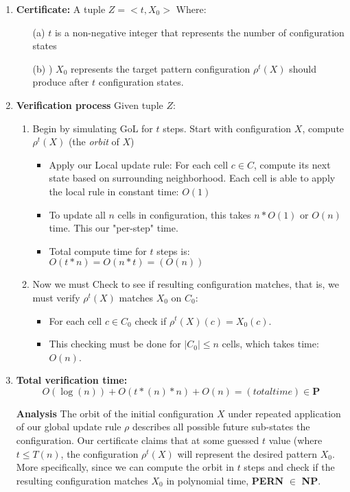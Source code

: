 \documentclass{article}
\theoremstyle{definition}
\theoremstyle{plain}
\theoremstyle{plain}
\begin{document}
\begin{enumerate}
    \item \textbf{Certificate:} A tuple $Z = <t, X_0 >$
      Where: 
      \begin{enumerate}
          \item[(a)] $t$ is a non-negative integer that represents the number of configuration states 
          \item[(b)]) $X_0$ represents the target pattern configuration $\rho^t(X)$ should produce after $t$ configuration states.
      \end{enumerate}
    \item \textbf{Verification process} Given tuple $Z$:
    \begin{enumerate}
        \item Begin by simulating GoL for $t$ steps. Start with configuration $X$, compute $\rho^t(X)$ (the \textit{orbit} of $X$)
        \begin{itemize}
            \item Apply our Local update rule: For each cell $c \in C$, compute its next state based on surrounding neighborhood. Each cell is able to apply the local rule in constant time: $O(1)$
            \item To update all $n$ cells in configuration, this takes $n*O(1)$ or $O(n)$ time. This our "per-step" time.
            \item Total compute time for $t$ steps is: $O(t * n) = O(n * t) = (O(n))$
        \end{itemize}
        \item Now we must Check to see if resulting configuration matches, that is, we must verify $\rho^t(X)$  matches $X_0$ on $C_0$:
        \begin{itemize}
            \item For each cell $c \in C_0$ check if $\rho^t(X)(c) = X_0(c)$.
            \item This checking must be done for $ |C_0| \leq n $ cells, which takes time: $ O(n) $.
        \end{itemize}
    \end{enumerate}

    \item \textbf{Total verification time: }
      \begin{equation}
        O(\log(n))+O(t*(n)*n)+O(n)= (total time) \in \textbf{P}
    \end{equation}

  \item[]\textbf{Analysis}
    The orbit of the initial configuration $X$ under repeated application of our global update rule $\rho$ describes all possible future sub-states the configuration. Our certificate claims that at some guessed $t$ value (where $t \leq T(n)$, the configuration $\rho^t(X)$ will represent the desired pattern $X_0$. More specifically, since we can compute the orbit in $t$ steps and check if the resulting configuration matches $X_0$ in polynomial time, \textbf{PERN} $\in$ \textbf{NP}.
\end{enumerate}
\end{document}
